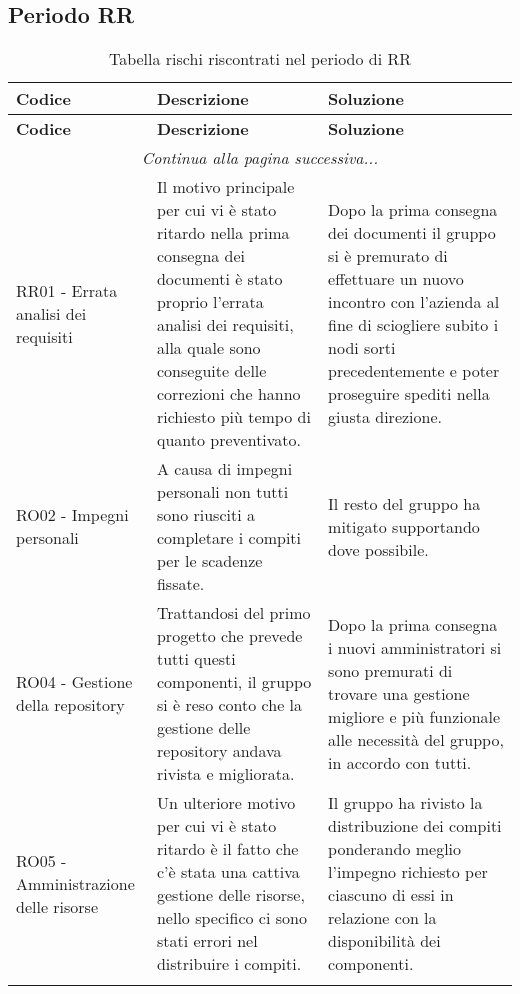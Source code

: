 \documentclass[../piano_di_progetto.tex]{subfiles}
\begin{document}
\subsection{Periodo RR}
\label{sub:rischi_rr}
\begin{center}
	\begin{longtable}{|p{4cm}|p{6cm}|p{6cm}|}
		\hline
		\rowcolor{lightgray}
		{\textbf{Codice}} & {\textbf{Descrizione}} & {\textbf{Soluzione}} \\
		\hline
		\endfirsthead
	
		\hline
		\rowcolor{lightgray}
		{\textbf{Codice}} & {\textbf{Descrizione}} & {\textbf{Soluzione}} \\
		\hline
		\endhead
		
		\hline
		\multicolumn{3}{|c|}{\emph{Continua alla pagina successiva...}}\\
		\hline
		\endfoot

		\endlastfoot
        RR01 - Errata analisi dei requisiti 
        & Il motivo principale per cui vi è stato ritardo nella prima consegna dei documenti è stato proprio l’errata analisi dei requisiti, alla quale sono conseguite delle correzioni che hanno richiesto più tempo di quanto preventivato.  
        & Dopo la prima consegna dei documenti il gruppo si è premurato di effettuare un nuovo incontro con l’azienda al fine di sciogliere subito i nodi sorti precedentemente e poter proseguire spediti nella giusta direzione. \\
        
        RO02 - Impegni personali
        & A causa di impegni personali non tutti sono riusciti a completare i compiti per le scadenze fissate.
        & Il resto del gruppo ha mitigato supportando dove possibile. \\
        
        RO04 - Gestione della repository
        & Trattandosi del primo progetto che prevede tutti questi componenti, il gruppo si è reso conto che la gestione delle repository andava rivista e migliorata.
        & Dopo la prima consegna i nuovi amministratori si sono premurati di trovare una gestione migliore e più funzionale alle necessità del gruppo, in accordo con tutti. \\

        RO05 - Amministrazione delle risorse
        & Un ulteriore motivo per cui vi è stato ritardo è il fatto che c’è stata una cattiva gestione delle risorse, nello specifico ci sono stati errori nel distribuire i compiti.
        & Il gruppo ha rivisto la distribuzione dei compiti ponderando meglio l’impegno richiesto per ciascuno di essi in relazione con la disponibilità dei componenti. \\
        
        \hline
		\rowcolor{white}
		\caption{Tabella rischi riscontrati nel periodo di RR}
	\end{longtable}

\end{center}
\end{document}
